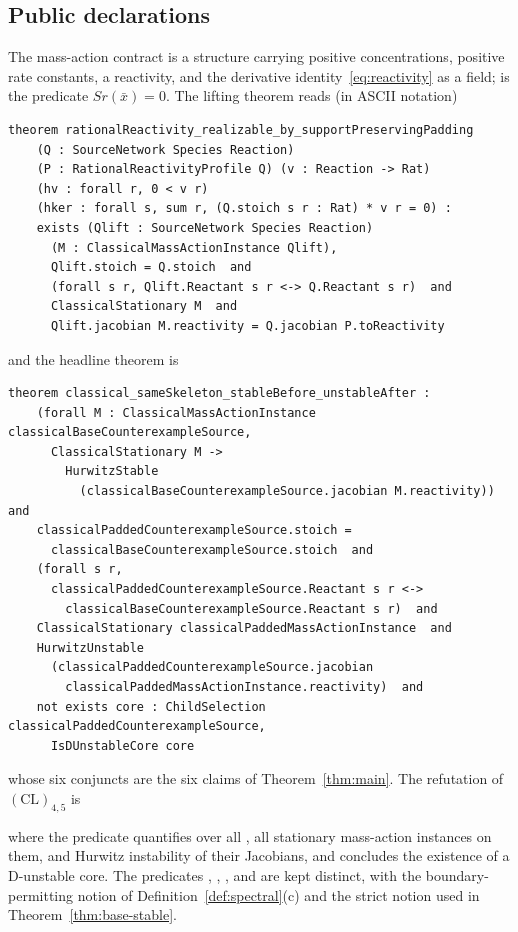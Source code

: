 \documentclass[11pt,a4paper]{article}
\theoremstyle{plain}
\theoremstyle{definition}
\theoremstyle{remark}
\newcommand{\xbar}{\bar{x}}
\begin{document}
\subsection{Public declarations}

The mass-action contract is a structure  carrying positive concentrations, positive rate constants, a reactivity, and the derivative identity~\eqref{eq:reactivity} as a field;  is the predicate $Sr(\xbar)=0$. The lifting theorem reads (in ASCII notation)
{\footnotesize\begin{verbatim}
theorem rationalReactivity_realizable_by_supportPreservingPadding
    (Q : SourceNetwork Species Reaction)
    (P : RationalReactivityProfile Q) (v : Reaction -> Rat)
    (hv : forall r, 0 < v r)
    (hker : forall s, sum r, (Q.stoich s r : Rat) * v r = 0) :
    exists (Qlift : SourceNetwork Species Reaction)
      (M : ClassicalMassActionInstance Qlift),
      Qlift.stoich = Q.stoich  and
      (forall s r, Qlift.Reactant s r <-> Q.Reactant s r)  and
      ClassicalStationary M  and
      Qlift.jacobian M.reactivity = Q.jacobian P.toReactivity
\end{verbatim}}
and the headline theorem is
{\footnotesize\begin{verbatim}
theorem classical_sameSkeleton_stableBefore_unstableAfter :
    (forall M : ClassicalMassActionInstance classicalBaseCounterexampleSource,
      ClassicalStationary M ->
        HurwitzStable
          (classicalBaseCounterexampleSource.jacobian M.reactivity))  and
    classicalPaddedCounterexampleSource.stoich =
      classicalBaseCounterexampleSource.stoich  and
    (forall s r,
      classicalPaddedCounterexampleSource.Reactant s r <->
        classicalBaseCounterexampleSource.Reactant s r)  and
    ClassicalStationary classicalPaddedMassActionInstance  and
    HurwitzUnstable
      (classicalPaddedCounterexampleSource.jacobian
        classicalPaddedMassActionInstance.reactivity)  and
    not exists core : ChildSelection classicalPaddedCounterexampleSource,
      IsDUnstableCore core
\end{verbatim}}
whose six conjuncts are the six claims of Theorem~\ref{thm:main}. The refutation of $\mathrm{(CL)}_{4,5}$ is
\begin{center}\small
{}
\end{center}
where the predicate quantifies over all , all stationary mass-action instances on them, and Hurwitz instability of their Jacobians, and concludes the existence of a D-unstable core. The predicates , , ,  and  are kept distinct, with  the boundary-permitting notion of Definition~\ref{def:spectral}(c) and  the strict notion used in Theorem~\ref{thm:base-stable}.
\end{document}
